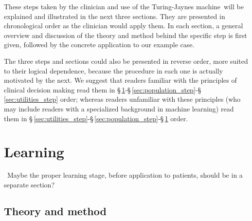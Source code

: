 \documentclass[utf8]{FrontiersinHarvard} %
\newcommand*{\puzzle}{{\fontencoding{U}\fontfamily{fontawesometwo}\selectfont\symbol{225}}}
\newcommand{\mynotez}[1]{{\color{notecolour}\puzzle\ #1}}
\newcommand*{\sect}{\S}%
\renewcommand*{\|}[1][]{\nonscript\:#1\vert\nonscript\:\mathopen{}}
\newcommand*{\tjm}{Turing-Jaynes machine}
\begin{document}
These steps taken by the clinician and use of the \tjm\ will be explained and illustrated in the next three sections. They are presented in chronological order as the clinician would apply them. In each section, a general overview and discussion of the theory and method behind the specific step is first given, followed by the concrete application to our example case.

The three steps and sections could also be presented in reverse order, more suited to their logical dependence, because the procedure in each one is actually motivated by the next. We suggest that readers familiar with the principles of clinical decision making read them in \sect\,\ref{sec:learning_step}-\sect\,\ref{sec:population_step}-\sect\,\ref{sec:utilities_step} order; whereas readers unfamiliar with these principles (who may include readers with a specialized background in machine learning) read them in \sect\,\ref{sec:utilities_step}-\sect\,\ref{sec:population_step}-\sect\,\ref{sec:learning_step} order.


\section{Learning}
\label{sec:learning_step}

\mynotez{Maybe the proper learning stage, before application to patients, should be in a separate section?}

\subsection{Theory and method}
\label{sec:learning_theory}
\end{document}
